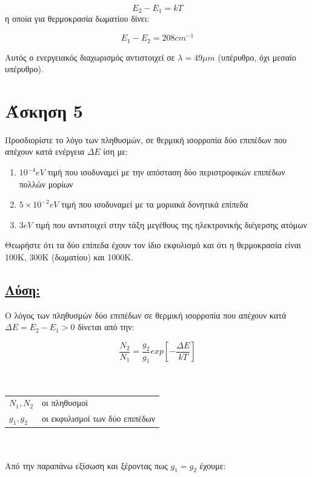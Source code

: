 \documentclass[a4paper,11pt,titlepage]{article}
\begin{document}
\begin{equation}
 E_2-E_1=kT
\end{equation}
η οποία για θερμοκρασία δωματίου δίνει:

\begin{equation}
 E_1-E_2=208cm^{-1}
\end{equation}

Αυτός ο ενεργειακός διαχωρισμός αντιστοιχεί σε $\lambda=49{\mu}m$ (υπέρυθρο, όχι μεσαίο υπέρυθρο).
\newpage
\section{Άσκηση 5}

Προσδιορίστε το λόγο των πληθυσμών, σε θερμική ισορροπία δύο επιπέδων που απέχουν κατά ενέργεια ${\Delta}E$ ίση με:
\begin{enumerate}
 \item$10^{-4}eV$ τιμή που ισοδυναμεί με την απόσταση δύο περιστροφικών επιπέδων πολλών μορίων 
 \item$5\times10^{-2}eV$ τιμή που ισοδυναμεί με τα μοριακά δονητικά επίπεδα
 \item$3eV$ τιμή που αντιστοιχεί στην τάξη μεγέθους της ηλεκτρονικής διέγερσης ατόμων
\end{enumerate}
Θεωρήστε ότι τα δύο επίπεδα έχουν τον ίδιο εκφυλισμό και ότι η θερμοκρασία είναι 100Κ, 300Κ (δωματίου) και 1000Κ.
\subsection*{\underline{Λύση:}}
Ο λόγος των πληθυσμών δύο επιπέδων σε θερμική ισορροπία που απέχουν κατά \\${\Delta}E=E_2-E_1>0$ δίνεται από την:

\begin{equation}
\dfrac{N_2}{N_1}=\dfrac{g_2}{g_1}exp[-\dfrac{{\Delta}E}{kT}]
\end{equation}
\\\\

\begin{tabular}{l | l}
\hline
 $N_1,N_2$ & οι πληθυσμοί\\
 $g_1,g_2$ & οι εκφυλισμοί των δύο επιπέδων\\
\hline
\end{tabular}
\\\\
Από την παραπάνω εξίσωση και ξέροντας πως $g_1=g_2$ έχουμε:
\end{document}
